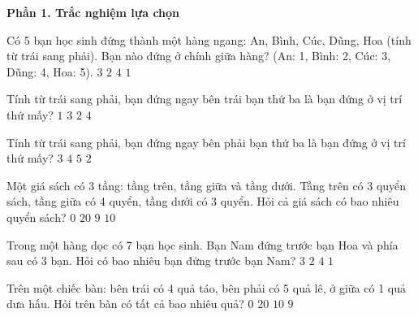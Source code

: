 \textbf{Phần 1. Trắc nghiệm lựa chọn}

\begin{ex} %
Có 5 bạn học sinh đứng thành một hàng ngang: An, Bình, Cúc, Dũng, Hoa (tính từ trái sang phải). Bạn nào đứng ở chính giữa hàng? (An: 1, Bình: 2, Cúc: 3, Dũng: 4, Hoa: 5).
\choice
{\True $3$}
{$2$}
{$4$}
{$1$}
\end{ex}

\begin{ex} %
Tính từ trái sang phải, bạn đứng ngay bên trái bạn thứ ba là bạn đứng ở vị trí thứ mấy?
\choice
{$1$}
{$3$}
{\True $2$}
{$4$}
\end{ex}

\begin{ex} %
Tính từ trái sang phải, bạn đứng ngay bên phải bạn thứ ba là bạn đứng ở vị trí thứ mấy?
\choice
{$3$}
{\True $4$}
{$5$}
{$2$}
\end{ex}

\begin{ex} %
Một giá sách có 3 tầng: tầng trên, tầng giữa và tầng dưới. Tầng trên có 3 quyển sách, tầng giữa có 4 quyển, tầng dưới có 3 quyển. Hỏi cả giá sách có bao nhiêu quyển sách?
\choice
{$0$}
{$20$}
{$9$}
{\True $10$}
\end{ex}

\begin{ex} %
Trong một hàng dọc có 7 bạn học sinh. Bạn Nam đứng trước bạn Hoa và phía sau có 3 bạn. Hỏi có bao nhiêu bạn đứng trước bạn Nam?
\choice
{\True $3$}
{$2$}
{$4$}
{$1$}
\end{ex}

\begin{ex} %
Trên một chiếc bàn: bên trái có 4 quả táo, bên phải có 5 quả lê, ở giữa có 1 quả dưa hấu. Hỏi trên bàn có tất cả bao nhiêu quả?
\choice
{$0$}
{$20$}
{\True $10$}
{$9$}
\end{ex}


